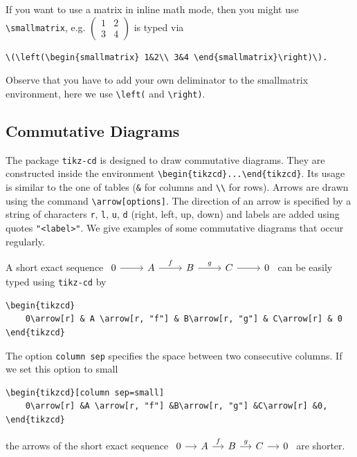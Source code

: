 \documentclass{zbMATH}
\begin{document}
If you want to use a matrix in inline math mode, then you might use \verb|\smallmatrix|, e.g. \(\left(\begin{smallmatrix} 1&2\\ 3&4 \end{smallmatrix}\right)\) is typed via
\begin{verbatim}
\(\left(\begin{smallmatrix} 1&2\\ 3&4 \end{smallmatrix}\right)\).
\end{verbatim}
Observe that you have to add your own deliminator to the smallmatrix environment, here we use \verb|\left(| and \verb|\right)|.

\subsection*{Commutative Diagrams}

The package \texttt{tikz-cd} is designed to draw commutative diagrams. They are constructed inside the environment \verb|\begin{tikzcd}...\end{tikzcd}|. Its usage is similar to the one of tables (\verb|&| for columns and \verb|\\| for rows). Arrows are drawn using the command \verb|\arrow[options]|. The direction of an arrow is specified by a string of characters \texttt{r}, \texttt{l}, \texttt{u}, \texttt{d} (right, left, up, down) and labels are added using quotes \texttt{"<label>"}. We give examples of some commutative diagrams that occur regularly.

A short exact sequence 
\(
\begin{tikzcd}
    0\arrow[r] & A \arrow[r, "f"] & B\arrow[r, "g"] & C\arrow[r] & 0
\end{tikzcd}
\)
can be easily typed using \texttt{tikz-cd} by
\begin{verbatim}
\begin{tikzcd}
    0\arrow[r] & A \arrow[r, "f"] & B\arrow[r, "g"] & C\arrow[r] & 0
\end{tikzcd}
\end{verbatim}
The option \texttt{column sep} specifies the space between two consecutive columns. If we set this option to small
\begin{verbatim}
\begin{tikzcd}[column sep=small]
    0\arrow[r] &A \arrow[r, "f"] &B\arrow[r, "g"] &C\arrow[r] &0,
\end{tikzcd}
\end{verbatim}
the arrows of the short exact sequence 
\(
\begin{tikzcd}[column sep=small]
    0\arrow[r] & A \arrow[r, "f"] & B\arrow[r, "g"] & C\arrow[r] & 0
\end{tikzcd}
\)
are shorter.
\end{document}
